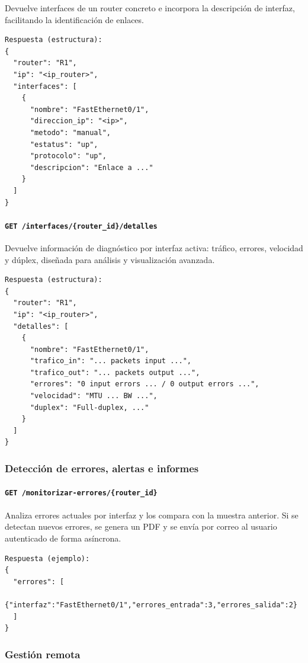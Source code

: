 Devuelve interfaces de un router concreto e incorpora la descripción de interfaz, facilitando la identificación de enlaces.
\begin{verbatim}
Respuesta (estructura):
{
  "router": "R1",
  "ip": "<ip_router>",
  "interfaces": [
    {
      "nombre": "FastEthernet0/1",
      "direccion_ip": "<ip>",
      "metodo": "manual",
      "estatus": "up",
      "protocolo": "up",
      "descripcion": "Enlace a ..."
    }
  ]
}
\end{verbatim}

\paragraph*{\texttt{GET /interfaces/\{router\_id\}/detalles}}


Devuelve información de diagnóstico por interfaz activa: tráfico, errores, velocidad y dúplex, diseñada para análisis y visualización avanzada.
\begin{verbatim}
Respuesta (estructura):
{
  "router": "R1",
  "ip": "<ip_router>",
  "detalles": [
    {
      "nombre": "FastEthernet0/1",
      "trafico_in": "... packets input ...",
      "trafico_out": "... packets output ...",
      "errores": "0 input errors ... / 0 output errors ...",
      "velocidad": "MTU ... BW ...",
      "duplex": "Full-duplex, ..."
    }
  ]
}
\end{verbatim}

\subsubsection*{Detección de errores, alertas e informes}

\paragraph*{\texttt{GET /monitorizar-errores/\{router\_id\}}}

Analiza errores actuales por interfaz y los compara con la muestra anterior. Si se detectan nuevos errores, se genera un PDF y se envía por correo 
al usuario autenticado de forma asíncrona.
\begin{verbatim}
Respuesta (ejemplo):
{
  "errores": [
    {"interfaz":"FastEthernet0/1","errores_entrada":3,"errores_salida":2}
  ]
}
\end{verbatim}

\subsubsection*{Gestión remota}

